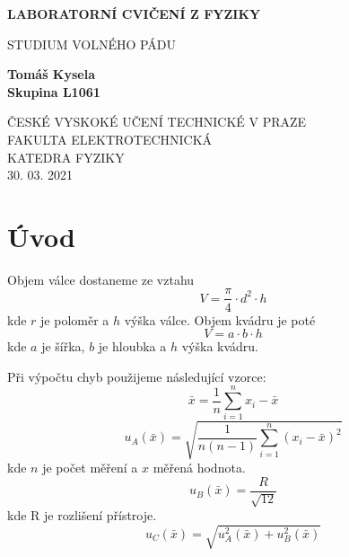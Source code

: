 \documentclass[titlepage]{article}
\begin{document}
	\begin{titlepage}
		\begin{center}
			\vspace*{1cm}
			
			\Large
			\textbf{LABORATORNÍ CVIČENÍ Z FYZIKY}
			
			\vspace{0.5cm}
			STUDIUM VOLNÉHO PÁDU
			
			\vspace{1.5cm}
			
			\textbf{Tomáš Kysela}\\
			\textbf{Skupina L1061}
			
			\vfill
			
			\vspace{0.8cm}
			
			
			ČESKÉ VYSKOKÉ UČENÍ TECHNICKÉ V PRAZE\\
			FAKULTA ELEKTROTECHNICKÁ\\
			KATEDRA FYZIKY\\
			30. 03. 2021
			
		\end{center}
	\end{titlepage}
	\section{Úvod}
	Objem válce dostaneme ze vztahu
	\begin{equation}
		V = \frac{\pi}{4} \cdot d^2 \cdot h
	\end{equation}
kde $r$ je poloměr a $h$ výška válce.
	Objem kvádru je poté
	\begin{equation}
		V = a \cdot b \cdot h
	\end{equation}
kde $a$ je šířka, $b$ je hloubka a $h$ výška kvádru.

Při výpočtu chyb použijeme následující vzorce:
\begin{equation}
	\bar{x} = \frac{1}{n}\sum_{i=1}^{n}x_i-\bar{x}
\end{equation}
\begin{equation}
	u_A(\bar{x}) = \sqrt{\frac{1}{n(n-1)}\sum_{i=1}^{n}(x_i-\bar{x})^2}
\end{equation}
kde $n$ je počet měření a $x$ měřená hodnota.
\begin{equation}
	u_B(\bar{x}) = \frac{R}{\sqrt{12}}
\end{equation}
kde R je rozlišení přístroje.
\begin{equation}
	u_C(\bar{x}) = \sqrt{u_A^2(\bar{x}) + u_B^2(\bar{x})}
\end{equation}
\end{document}
